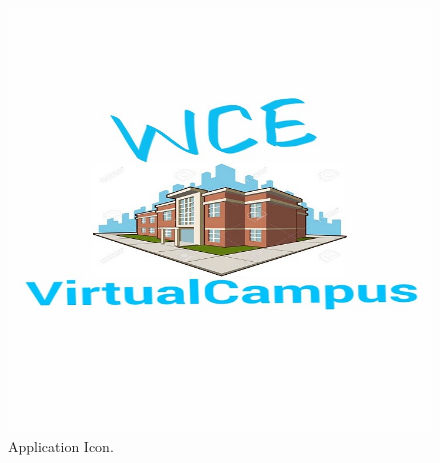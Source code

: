 \documentclass{article}
\begin{document}
\iffalse
\begin{center}
\begin{figure}[h]
	\includegraphics[scale=.3]{Icon.png}
	\caption{Application Icon. }
\end{figure}
\end{center}
\vspace{5cm}
\end{document}
